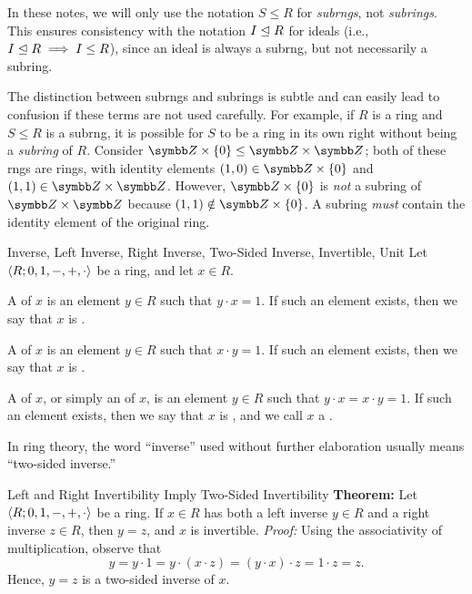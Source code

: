 \documentclass[12pt]{report}
\begin{document}
In these notes, we will only use the notation $S \le R$ for \textit{subrngs}, not \textit{subrings}. This ensures consistency with the notation $I \trianglelefteq R$ for ideals (i.e., $I \trianglelefteq R \implies I \le R$), since an ideal is always a subrng, but not necessarily a subring.

The distinction between subrngs and subrings is subtle and can easily lead to confusion if these terms are not used carefully. For example, if $R$ is a ring and $S \le R$ is a subrng, it is possible for $S$ to be a ring in its own right without being a \textit{subring} of $R$. Consider $\Z \times \{0\} \le \Z \times \Z$; both of these rngs are rings, with identity elements $(1, 0) \in \Z \times \{0\}$ and $(1, 1) \in \Z \times \Z$. However, $\Z \times \{0\}$ is \textit{not} a subring of $\Z \times \Z$ because $(1, 1) \notin \Z \times \{0\}$. A subring \textit{must} contain the identity element of the original ring.

\begin{dfnbox}{Inverse, Left Inverse, Right Inverse, Two-Sided Inverse, Invertible, Unit}
	Let ${\langle {R; 0, 1, -, +, \cdot} \rangle}$ be a ring, and let $x \in R$.
	\begin{dfnitems}
		\item A  of $x$ is an element $y \in R$ such that $y \cdot x = 1$. If such an element exists, then we say that $x$ is .
		\item A  of $x$ is an element $y \in R$ such that $x \cdot y = 1$. If such an element exists, then we say that $x$ is .
		\item A  of $x$, or simply an  of $x$, is an element $y \in R$ such that $y \cdot x = x \cdot y = 1$. If such an element exists, then we say that $x$ is , and we call $x$ a .
	\end{dfnitems}
\end{dfnbox}

In ring theory, the word ``inverse'' used without further elaboration usually means ``two-sided inverse.''

\begin{thmbox}{Left and Right Invertibility Imply Two-Sided Invertibility}
	\textbf{Theorem:} Let ${\langle {R; 0, 1, -, +, \cdot} \rangle}$ be a ring. If $x \in R$ has both a left inverse $y \in R$ and a right inverse $z \in R$, then $y = z$, and $x$ is invertible.
\tcblower
	\textit{Proof:} Using the associativity of multiplication, observe that
	\[ y = y \cdot 1 = y \cdot (x \cdot z) = (y \cdot x) \cdot z = 1 \cdot z = z. \]
	Hence, $y = z$ is a two-sided inverse of $x$.
\end{thmbox}
\end{document}
